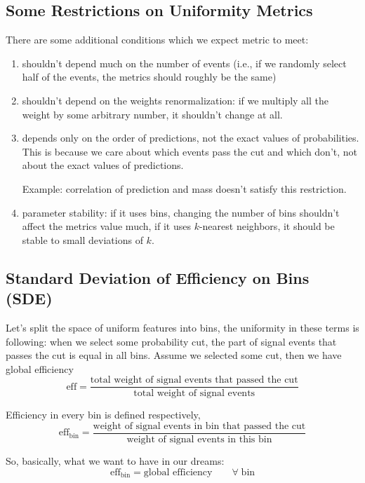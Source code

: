 \documentclass[12pt]{article}
\theoremstyle{definition}
\theoremstyle{remark}
\begin{document}
\subsection{Some Restrictions on Uniformity Metrics}

There are some additional conditions which we expect metric to meet:
\begin{enumerate}
\item
shouldn't depend much on the number of events (i.e., if we randomly select half of the events, the metrics should roughly be the same)
\item
shouldn't depend on the weights renormalization: if we multiply all the weight by some arbitrary number, it shouldn't change at all.
\item 
depends only on the order of predictions, not the exact values of probabilities.
This is because we care about which events pass the cut and which don't, not about the exact values of predictions.

Example: correlation of prediction and mass doesn't satisfy this restriction.
\item
parameter stability: if it uses bins, changing the number of bins shouldn't affect the metrics value much, if it uses $k$-nearest neighbors, it should be stable to small deviations of $k$.
\end{enumerate}


\subsection{Standard Deviation of Efficiency on Bins (SDE)}

\def\bineff{\text{eff}_\text{bin}}
\def\binweight{\text{weight}_\text{bin}}
\def\globaleff{\text{eff}}
\def\SDE{\text{SDE}}
\def\bin{\text{bin}}


Let's split the space of uniform features into bins, the uniformity in these terms is following: when we select some probability cut, 
the part of signal events that passes the cut is equal in all bins. Assume we selected some cut, then we have global efficiency
\[
	\globaleff = \dfrac{
		\text{total weight of signal events that passed the cut}}
		{\text{total weight of signal events}}
\]

Efficiency in every bin is defined respectively, 
\[
	\bineff = \dfrac{
		\text{weight of signal events in bin that passed the cut}}
		{\text{weight of signal events in this bin}} 
\]

So, basically, what we want to have in our dreams:
\[
	\bineff = \text{global efficiency} \qquad \forall \; \text{bin}
\]
\end{document}
